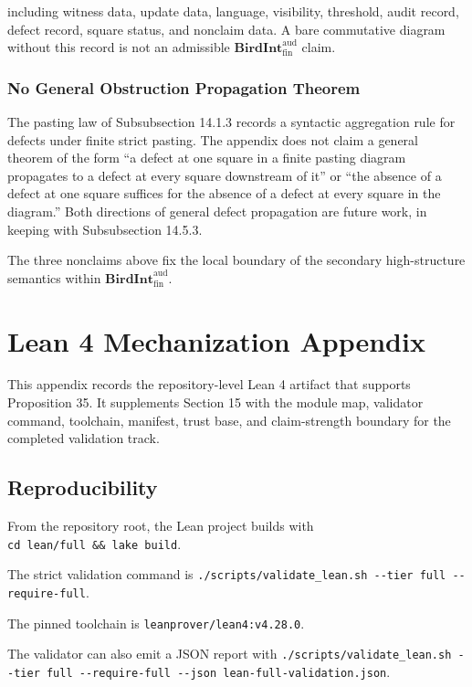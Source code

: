\documentclass[11pt]{article}
\theoremstyle{definition}
\begin{document}
including witness data, update data, language, visibility, threshold, audit record, defect record, square status, and nonclaim data. A bare commutative diagram without this record is not an admissible \(\mathbf{BirdInt}^{\mathrm{aud}}_{\mathrm{fin}}\) claim.

\subsubsection{No General Obstruction Propagation Theorem}

The pasting law of Subsubsection 14.1.3 records a syntactic aggregation rule for defects under finite strict pasting. The appendix does not claim a general theorem of the form ``a defect at one square in a finite pasting diagram propagates to a defect at every square downstream of it'' or ``the absence of a defect at one square suffices for the absence of a defect at every square in the diagram.'' Both directions of general defect propagation are future work, in keeping with Subsubsection 14.5.3.

The three nonclaims above fix the local boundary of the secondary high-structure semantics within \(\mathbf{BirdInt}^{\mathrm{aud}}_{\mathrm{fin}}\).
 \section{Lean 4 Mechanization Appendix}

This appendix records the repository-level Lean 4 artifact that supports Proposition 35. It supplements Section 15 with the module map, validator command, toolchain, manifest, trust base, and claim-strength boundary for the completed validation track.

\subsection{Reproducibility}

From the repository root, the Lean project builds with \texttt{cd\ lean/full\ \&\&\ lake\ build}.

The strict validation command is \texttt{./scripts/validate\_lean.sh\ -\/-tier\ full\ -\/-require-full}.

The pinned toolchain is \texttt{leanprover/lean4:v4.28.0}.

The validator can also emit a JSON report with \texttt{./scripts/validate\_lean.sh\ -\/-tier\ full\ -\/-require-full\ -\/-json\ lean-full-validation.json}.
\end{document}
